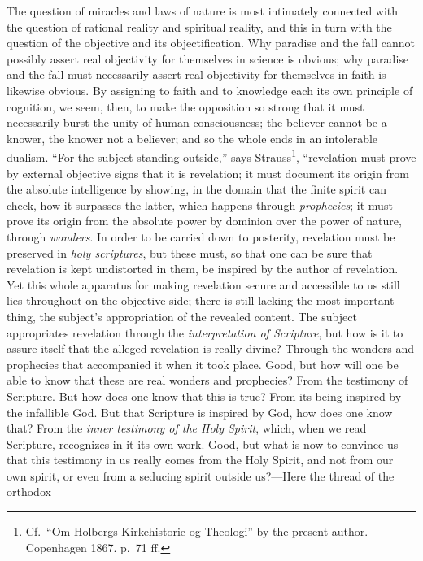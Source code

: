 \documentclass[12pt,a4paper]{article}
\newcommand{\opage}[1]{\marginnote{\footnotesize\textit{[#1]}}}
\begin{document}
The question of miracles and laws of nature is most intimately
connected with the question of rational reality and spiritual reality,
and this in turn with the question of the objective and its
objectification. Why paradise and the fall cannot possibly assert real
objectivity for themselves in science is obvious; why paradise and the
fall must necessarily assert real objectivity for themselves in faith is
likewise obvious. By assigning to faith and to knowledge each its own
principle of cognition, we seem, then, to make the opposition so strong
that it must necessarily burst the unity of human consciousness; the
believer cannot be a knower, the knower not a believer; and so the whole
ends in an intolerable dualism. ``For the subject standing outside,''
says Strauss\footnote{Cf.\ ``Om Holbergs Kirkehistorie og Theologi'' by the present author.
Copenhagen 1867. p.\ 71 ff.}, %
``revelation must prove by external objective signs that it is
revelation; it must document its origin from the absolute intelligence
by showing, in the domain that the finite spirit can check, how it
surpasses the latter, which happens through \emph{prophecies}; it must
prove its origin from the absolute power by dominion over the power of
nature, through \emph{wonders}. In order to be carried down to posterity,
revelation must be preserved in \emph{holy scriptures}, but these must,
so that one can be sure that revelation is kept undistorted in them, be
inspired by the author of revelation. Yet this whole apparatus for making
revelation secure and accessible to us still lies throughout on the
objective side; there is still lacking the most important thing, the
subject's appropriation of the revealed content. The subject appropriates
revelation through the \emph{interpretation of Scripture}, but how is it
to assure itself that the alleged revelation is really divine? Through
the wonders and prophecies that accompanied it when it took place. Good,
but how will one
\opage{47}be able to know that these are real wonders and prophecies? From the
testimony of Scripture. But how does one know that this is true? From
its being inspired by the infallible God. But that Scripture is inspired
by God, how does one know that? From the \emph{inner testimony of the
Holy Spirit}, which, when we read Scripture, recognizes in it its own
work. Good, but what is now to convince us that this testimony in us
really comes from the Holy Spirit, and not from our own spirit, or even
from a seducing spirit outside us?---Here the thread of the orthodox
\end{document}
